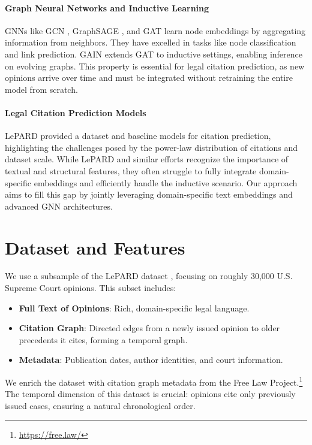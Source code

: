 \documentclass{article}
\begin{document}
\paragraph{Graph Neural Networks and Inductive Learning}
GNNs like GCN \citep{kipf2016semi}, GraphSAGE \citep{hamilton2018inductive}, and GAT \citep{velivckovic2018graph} learn node embeddings by aggregating information from neighbors. They have excelled in tasks like node classification and link prediction. GAIN \citep{weng2022gain} extends GAT to inductive settings, enabling inference on evolving graphs. This property is essential for legal citation prediction, as new opinions arrive over time and must be integrated without retraining the entire model from scratch.

\paragraph{Legal Citation Prediction Models}
LePARD \citep{mahari2022lepard} provided a dataset and baseline models for citation prediction, highlighting the challenges posed by the power-law distribution of citations and dataset scale. While LePARD and similar efforts recognize the importance of textual and structural features, they often struggle to fully integrate domain-specific embeddings and efficiently handle the inductive scenario. Our approach aims to fill this gap by jointly leveraging domain-specific text embeddings and advanced GNN architectures.

\section{Dataset and Features}
We use a subsample of the LePARD dataset \citep{mahari2022lepard}, focusing on roughly 30,000 U.S. Supreme Court opinions. This subset includes:
\begin{itemize}[leftmargin=*]
    \item \textbf{Full Text of Opinions}: Rich, domain-specific legal language.
    \item \textbf{Citation Graph}: Directed edges from a newly issued opinion to older precedents it cites, forming a temporal graph.
    \item \textbf{Metadata}: Publication dates, author identities, and court information.
\end{itemize}

We enrich the dataset with citation graph metadata from the Free Law Project.\footnote{\url{https://free.law/}} The temporal dimension of this dataset is crucial: opinions cite only previously issued cases, ensuring a natural chronological order.
\end{document}
